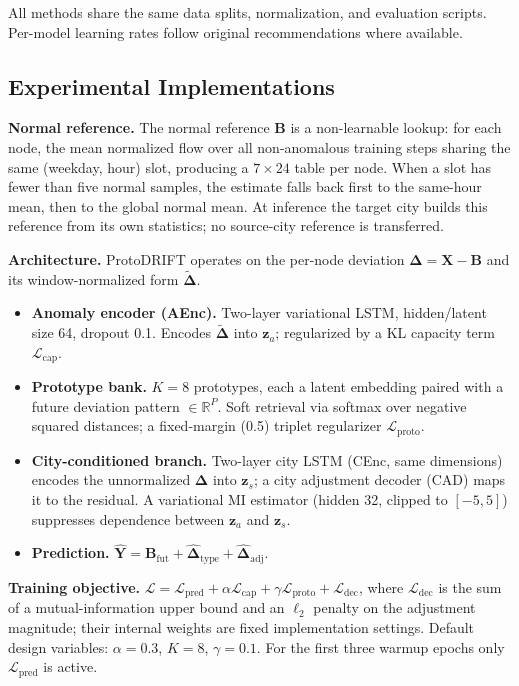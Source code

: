 All methods share the same data splits, normalization, and evaluation scripts. Per-model learning rates follow original recommendations where available.

\subsection{Experimental Implementations}

\noindent\textbf{Normal reference.} The normal reference $\mathbf{B}$ is a non-learnable lookup: for each node, the mean normalized flow over all non-anomalous training steps sharing the same (weekday, hour) slot, producing a $7\times24$ table per node. When a slot has fewer than five normal samples, the estimate falls back first to the same-hour mean, then to the global normal mean. At inference the target city builds this reference from its own statistics; no source-city reference is transferred.

\noindent\textbf{Architecture.} ProtoDRIFT operates on the per-node deviation $\boldsymbol{\Delta}=\mathbf{X}-\mathbf{B}$ and its window-normalized form $\widetilde{\boldsymbol{\Delta}}$.
\begin{itemize}
    \item \textbf{Anomaly encoder (AEnc).} Two-layer variational LSTM, hidden/latent size 64, dropout 0.1. Encodes $\widetilde{\boldsymbol{\Delta}}$ into $\mathbf{z}_a$; regularized by a KL capacity term $\mathcal{L}_{\mathrm{cap}}$.
    \item \textbf{Prototype bank.} $K{=}8$ prototypes, each a latent embedding paired with a future deviation pattern $\in\mathbb{R}^{P}$. Soft retrieval via softmax over negative squared distances; a fixed-margin (0.5) triplet regularizer $\mathcal{L}_{\mathrm{proto}}$.
    \item \textbf{City-conditioned branch.} Two-layer city LSTM (CEnc, same dimensions) encodes the unnormalized $\boldsymbol{\Delta}$ into $\mathbf{z}_s$; a city adjustment decoder (CAD) maps it to the residual. A variational MI estimator (hidden 32, clipped to $[-5,5]$) suppresses dependence between $\mathbf{z}_a$ and $\mathbf{z}_s$.
    \item \textbf{Prediction.} $\widehat{\mathbf{Y}}=\mathbf{B}_{\mathrm{fut}}+\widehat{\boldsymbol{\Delta}}_{\mathrm{type}}+\widehat{\boldsymbol{\Delta}}_{\mathrm{adj}}$.
\end{itemize}

\noindent\textbf{Training objective.} $\mathcal{L}=\mathcal{L}_{\mathrm{pred}}+\alpha\mathcal{L}_{\mathrm{cap}}+\gamma\mathcal{L}_{\mathrm{proto}}+\mathcal{L}_{\mathrm{dec}}$, where $\mathcal{L}_{\mathrm{dec}}$ is the sum of a mutual-information upper bound and an $\ell_2$ penalty on the adjustment magnitude; their internal weights are fixed implementation settings. Default design variables: $\alpha{=}0.3$, $K{=}8$, $\gamma{=}0.1$. For the first three warmup epochs only $\mathcal{L}_{\mathrm{pred}}$ is active.

